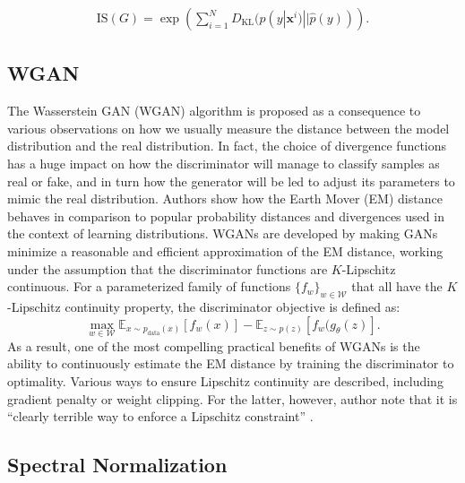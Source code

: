 \begin{equation}
\label{eq_IS2}
\begin{split}
\text{IS}(G) = \exp\left(\sum^N_{i=1}D_{\mathrm{KL}}(p(y|\bm{x}^i)||\hat{p}(y))\right).
\end{split}
\end{equation}


\subsection{WGAN}
The Wasserstein GAN (WGAN) algorithm is proposed as a consequence to various  observations on how we usually measure the distance between the model distribution and the real distribution. In fact, the choice of divergence functions has a huge impact on how the discriminator will manage to classify samples as real or fake, and in turn how the generator will be led to adjust its parameters to mimic the real distribution. Authors show how the Earth Mover (EM) distance behaves in comparison to popular probability distances and divergences used in the context of learning distributions. WGANs are developed by making GANs minimize a reasonable and efficient approximation of the EM distance, working under the assumption that the discriminator functions are $K$-Lipschitz continuous. For a parameterized family of functions $\{ f_w \}_{w \in \mathcal{W}}$ that all have the $K$-Lipschitz continuity property, the discriminator objective is defined as:
\begin{equation} \label{eq:wgan}
\max_{w \in \mathcal{W}} \mathbb{E}_{x \sim p_{\text{data}}(x)}[f_w(x)] -
\mathbb{E}_{z \sim p(z)} [f_w(g_\theta (z)].
\end{equation}
As a result, one of the most compelling practical benefits of WGANs is the ability to continuously estimate the EM distance by training the discriminator to optimality. Various ways to ensure Lipschitz continuity are described, including gradient penalty or weight clipping. For the latter, however, author note that it is ``clearly terrible way to enforce a Lipschitz constraint'' \cite{arjovsky2017wasserstein}.

\subsection{Spectral Normalization}
\label{sec:bg-sn}

